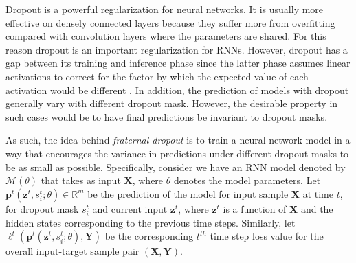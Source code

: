 \documentclass{article} %
\begin{document}
Dropout is a powerful regularization for neural networks. It is usually more effective on densely connected layers because they suffer more from overfitting compared with convolution layers where the parameters are shared. For this reason dropout is an important regularization for RNNs. However, dropout has a gap between its training and inference phase since the latter phase assumes linear activations to correct for the factor by which the expected value of each activation would be different \cite{ma2016dropout}. In addition, the prediction of models with dropout generally vary with different dropout mask. However, the desirable property in such cases would be to have final predictions be invariant to dropout masks.

As such, the idea behind \emph{fraternal dropout} is to train a neural network model in a way that encourages the variance in predictions under different dropout masks to be as small as possible. Specifically, consider we have an RNN model denoted by $\mathcal{M}(\theta)$ that takes as input $\mathbf{X}$, where $\theta$ denotes the model parameters. Let $\mathbf{p}^t(\mathbf{z}^t, s_i^t; \theta) \in \mathbb{R}^m$ be the prediction of the model for input sample $\mathbf{X}$ at time $t$, for dropout mask $s_i^t$ and current input $\mathbf{z}^t$, where $\mathbf{z}^t$ is a function of $\mathbf{X}$ and the hidden states corresponding to the previous time steps. Similarly, let $\ell^t(\mathbf{p}^t(\mathbf{z}^{t}, s_i^t; \theta),\mathbf{Y})$ be the corresponding $t^{th}$ time step loss value for the overall input-target sample pair $(\mathbf{X}, \mathbf{Y})$.
\end{document}
